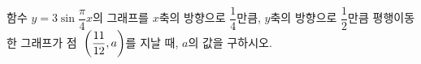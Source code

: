 함수 $y=3\sin\dfrac{\pi}{4}x$의 그래프를 $x$축의 방향으로 $\dfrac{1}{4}$만큼, $y$축의 방향으로 $\dfrac{1}{2}$만큼 평행이동한 그래프가 점~$\left(\dfrac{11}{12}{,}\mkern3mu\mathopen{}a\right)$를 지날 때, $a$의 값을 구하시오.

